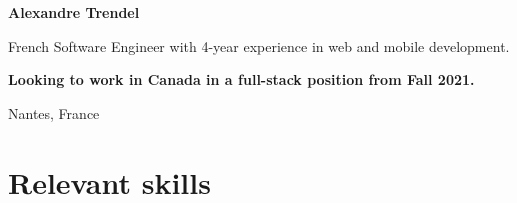 \documentclass{cv}
\begin{document}
\pagestyle{empty}

\noindent\textbf{\color{solviolet} \LARGE Alexandre Trendel}\medskip

\noindent\begin{minipage}[t]{0.5\textwidth}
	
	French Software Engineer with 4-year experience in web and mobile development. \smallskip
	
	\textbf{Looking to work in Canada in a full-stack position from Fall 2021.}	
\end{minipage}\hfill%
\begin{minipage}[t]{0.3\textwidth}
	
	 Nantes, France
	\newline{} %
	\newline{} \href{mailto:%
	}{\link{%
	}}%
	\newline{} \href{https://github.com/xou816}{} 
	
\end{minipage}

\bigskip\noindent{\color{solviolet}\rule{3cm}{1.5pt}}

\section{Relevant skills}
\end{document}

